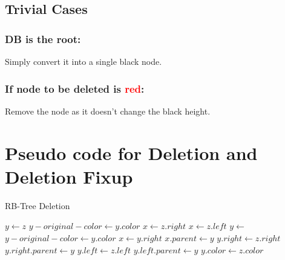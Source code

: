 \documentclass{article}
\begin{document}
\subsection{Trivial Cases}
\subsubsection{DB is the root:}
Simply convert it into a single black node.

\subsubsection{If node to be deleted is \textcolor{red}{red}:}
Remove the node as it doesn't change the black height.
\pagebreak
\section{Pseudo code for Deletion and Deletion Fixup}
\begin{algorithm}[h]
    \caption{RB-Tree Deletion}
    \begin{algorithmic}[1]
    \State $y \gets z$
\State $y-original-color \gets y.color$
\State $x \gets z.right$
\State {}
\State $x \gets z.left$
\State {}
\Else
\State $y \gets$ 
\State $y-original-color \gets y.color$
\State $x \gets y.right$
\State $x.parent \gets y$
\Else
\State {}
\State $y.right \gets z.right$
\State $y.right.parent \gets y$
\EndIf
\State {}
\State $y.left \gets z.left$
\State $y.left.parent \gets y$
\State $y.color \gets z.color$
\EndIf
{}
\State {}
\EndIf
    \EndProcedure
    \end{algorithmic}
\end{algorithm}
\end{document}
